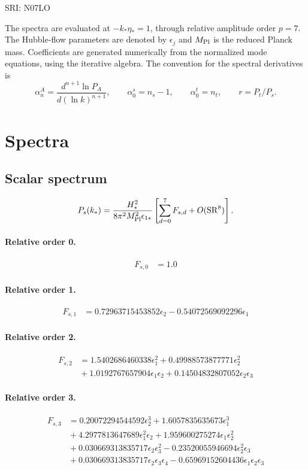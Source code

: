 \documentclass[10pt]{article}
\begin{document}
\begin{center}\Large SRI: N07LO\end{center}
The spectra are evaluated at $-k_*\eta_*=1$, through relative amplitude
order $p=7$. The Hubble-flow parameters are denoted by $\epsilon_j$
and $M_{\rm Pl}$ is the reduced Planck mass. Coefficients are generated
numerically from the normalized mode equations, using the iterative algebra.
The convention for the spectral derivatives is
\[
\alpha_n^A=\frac{d^{n+1}\ln P_A}{d(\ln k)^{n+1}},\qquad
\alpha_0^s=n_s-1,\qquad\alpha_0^t=n_t,\qquad r=P_t/P_s.
\]
\section{Spectra}

\subsection{Scalar spectrum}
\[P_s(k_*)=\frac{H_*^2}{8\pi^2M_{\rm Pl}^2\epsilon_{1*}}\left[\sum_{d=0}^{7}F_{s,d}+O(\mathrm{SR}^{8})\right].\]
\paragraph{Relative order 0.}
\begin{align*}
F_{s,0} &= 1.0
\end{align*}

\paragraph{Relative order 1.}
\begin{align*}
F_{s,1} &= 0.72963715453852 \epsilon_{2} - 0.54072569092296 \epsilon_{1}
\end{align*}

\paragraph{Relative order 2.}
\begin{align*}
F_{s,2} &= 1.5402686460338 \epsilon_{1}^{2} + 0.49988573877771 \epsilon_{2}^{2} \\
&{}  + 1.0192767657904 \epsilon_{1} \epsilon_{2} + 0.14504832807052 \epsilon_{2} \epsilon_{3}
\end{align*}

\paragraph{Relative order 3.}
\begin{align*}
F_{s,3} &= 0.20072294544592 \epsilon_{2}^{3} + 1.6057835635673 \epsilon_{1}^{3} \\
&{}  + 4.2977813647689 \epsilon_{1}^{2} \epsilon_{2} + 1.959600275274 \epsilon_{1} \epsilon_{2}^{2} \\
&{}  + 0.030669313835717 \epsilon_{2} \epsilon_{3}^{2} - 0.23520055946694 \epsilon_{2}^{2} \epsilon_{3} \\
&{}  + 0.030669313835717 \epsilon_{2} \epsilon_{3} \epsilon_{4} - 0.65969152604436 \epsilon_{1} \epsilon_{2} \epsilon_{3}
\end{align*}
\end{document}

